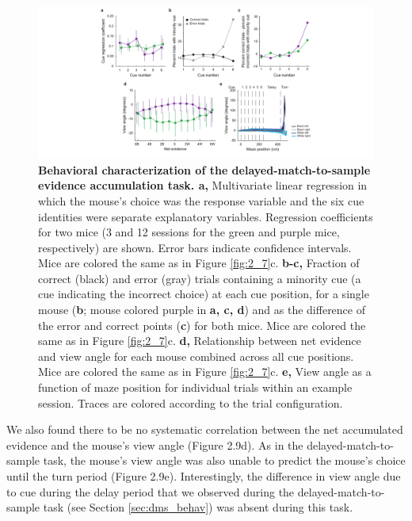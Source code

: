 \begin{figure}
\includegraphics[width=1.4\textwidth,center]{figures/fig_2_9.pdf}
\caption[Behavioral characterization of the delayed-match-to-sample evidence accumulation task.]{
\textbf{Behavioral characterization of the delayed-match-to-sample evidence accumulation task. a,} Multivariate linear regression in which the mouse's choice was the response variable and the six cue identities were separate explanatory variables. Regression coefficients for two mice (3 and 12 sessions for the green and purple mice, respectively) are shown. Error bars indicate confidence intervals. Mice are colored the same as in Figure \ref{fig:2_7}c.
%
\textbf{b-c,} Fraction of correct (black) and error (gray) trials containing a minority cue (a cue indicating the incorrect choice) at each cue position, for a single mouse (\textbf{b}; mouse colored purple in \textbf{a, c, d}) and as the difference of the error and correct points (\textbf{c}) for both mice. Mice are colored the same as in Figure \ref{fig:2_7}c. 
%
\textbf{d,} Relationship between net evidence and view angle for each mouse combined across all cue positions. Mice are colored the same as in Figure \ref{fig:2_7}c.
%
\textbf{e,} View angle as a function of maze position for individual trials within an example session. Traces are colored according to the trial configuration.
\label{fig:2_9}}
\end{figure}

\bigskip
We also found there to be no systematic correlation between the net accumulated evidence and the mouse’s view angle (Figure 2.9d). As in the delayed-match-to-sample task, the mouse’s view angle was also unable to predict the mouse’s choice until the turn period (Figure 2.9e). Interestingly, the difference in view angle due to cue during the delay period that we observed during the delayed-match-to-sample task (see Section \ref{sec:dms_behav}) was absent during this task.

